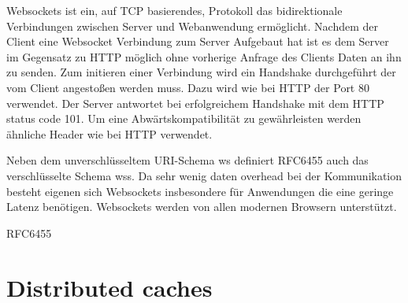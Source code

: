 Websockets ist ein, auf TCP basierendes, Protokoll das bidirektionale Verbindungen zwischen Server und Webanwendung ermöglicht. Nachdem der Client eine Websocket Verbindung zum Server Aufgebaut hat ist es dem Server im Gegensatz zu HTTP möglich ohne vorherige Anfrage des Clients Daten an ihn zu senden. Zum initieren einer Verbindung wird ein Handshake durchgeführt der vom Client angestoßen werden muss. Dazu wird wie bei HTTP der Port 80 verwendet. Der Server antwortet bei erfolgreichem Handshake mit dem HTTP status code 101. Um eine Abwärtskompatibilität zu gewährleisten werden ähnliche Header wie bei HTTP verwendet.

Neben dem unverschlüsseltem URI-Schema ws definiert RFC6455\cite{rfcWebsockets} auch das verschlüsselte Schema wss. Da  sehr wenig daten overhead bei der Kommunikation besteht eigenen sich Websockets insbesondere für Anwendungen die eine geringe Latenz benötigen. Websockets werden von allen modernen Browsern unterstützt.

%
%
%
% 
%  


RFC6455\cite{rfcWebsockets}


\section{Distributed caches}

